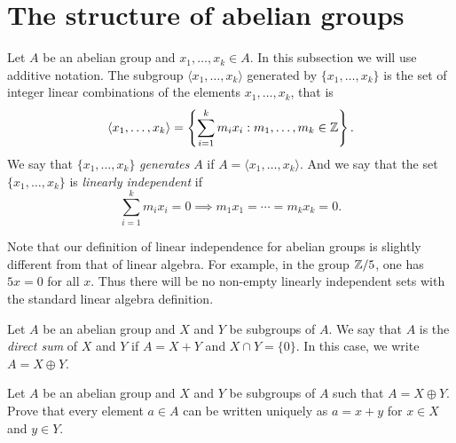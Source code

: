 %
%

\section{The structure of abelian groups}

Let $A$ be an abelian group and $x_1,\dots,x_k\in A$. In this subsection we will use additive notation.  
The subgroup $\langle x_1,\dots,x_k\rangle$ 
generated by $\{x_1,\dots,x_k\}$
is the set of integer linear combinations of the elements 
$x_1,\dots,x_k$, that is
\[ 
\langle x_1,\dots,x_k\rangle=\left\{ 
\sum_{i=1}^k m_ix_i: m_1,\dots,m_k\in\mathbb{Z}\right\}.
\]
We say that $\{x_1,\dots,x_k\}$ \emph{generates} $A$ if 
$A=\langle x_1,\dots,x_k\rangle$. And we say that the set 
$\{x_1,\dots,x_k\}$ is 
\emph{linearly independent} if 
\[
\sum_{i=1}^k m_ix_i=0\implies m_1x_1=\cdots=m_kx_k=0.
\]

Note that our definition of linear independence for abelian groups is slightly 
different from that of linear algebra. For example, in the group $\mathbb{Z}/5$, 
one has $5x=0$ for all $x$. Thus there will be no non-empty linearly independent sets with 
the standard linear algebra definition. 

\begin{definition}
    Let $A$ be an abelian group and $X$ and $Y$ be subgroups of $A$. 
    We say that $A$ is the \emph{direct sum} of $X$ and $Y$ 
    if $A=X+Y$ and $X\cap Y=\{0\}$. In this case, we write $A=X\oplus Y$. 
\end{definition}

\begin{exercise}
    Let $A$ be an abelian group and $X$ and $Y$ be subgroups of $A$
    such that $A=X\oplus Y$.     
    Prove that 
    every element $a\in A$ can be
    written uniquely as $a=x+y$ for $x\in X$ and $y\in Y$.     
\end{exercise}

